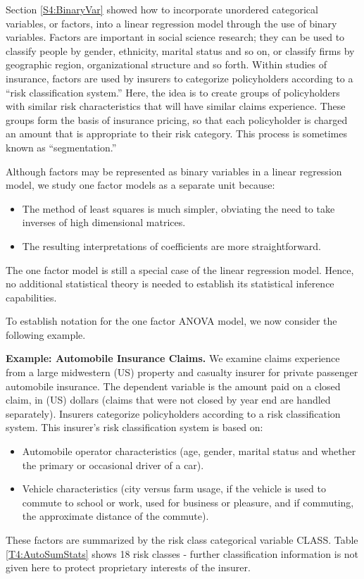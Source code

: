 Section \ref{S4:BinaryVar} showed how to incorporate unordered
categorical variables, or factors, into a linear regression model
through the use of binary variables. Factors are important in social
science research; they can be used to classify people by gender,
ethnicity, marital status and so on, or classify firms by geographic
region, organizational structure and so forth. Within studies of
insurance, factors are used by insurers to categorize policyholders
according to a ``risk classification system.'' Here, the idea is to
create groups of policyholders with similar risk characteristics
that will have similar claims experience. These groups form the
basis of insurance pricing, so that each policyholder is
charged an amount that is appropriate to their risk category. This
process is sometimes known as ``segmentation.''

Although factors may be represented as binary variables in a linear
regression model, we study one factor models as a separate unit
because:
\begin{itemize}
\item The method of least squares is much simpler, obviating the need to take inverses of high dimensional matrices.
\item The resulting interpretations of coefficients are more straightforward.
\end{itemize}
The one factor model is still a special case of the linear
regression model. Hence, no additional statistical theory is needed
to establish its statistical inference capabilities.

To establish notation for the one factor ANOVA model, we now
consider the following example.

\linejed

 

\textbf{Example: Automobile Insurance
Claims.} We examine claims experience
from a large midwestern (US) property and casualty insurer for
private passenger automobile insurance. The dependent variable is
the amount paid on a closed claim, in (US) dollars (claims that were
not closed by year end are handled separately). Insurers categorize
policyholders according to a risk classification system. This
insurer's risk classification system is based on:
\begin{itemize}
\item Automobile operator characteristics (age, gender, marital
  status and whether the primary or occasional driver of a car).
\item Vehicle characteristics (city versus farm usage, if the vehicle is used to commute to school or
    work, used for business or pleasure, and if commuting, the
    approximate distance of the commute).
\end{itemize}
These factors are summarized by the risk class categorical variable
CLASS. Table \ref{T4:AutoSumStats} shows 18 risk classes - further
classification information is not given here to protect proprietary
interests of the insurer.

